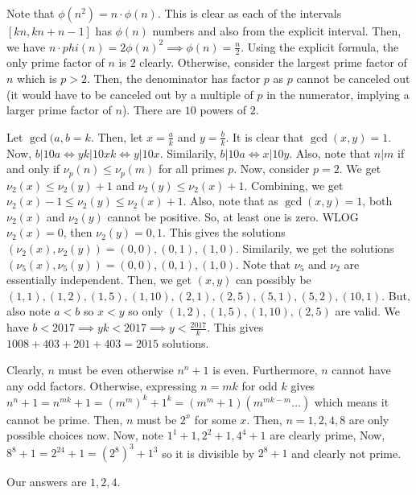 \documentclass[11pt]{article}
\begin{document}
\begin{sol}
Note that $\phi(n^2)=n\cdot \phi(n)$. This is clear as each of the intervals $[kn,kn+n-1]$ has $\phi(n)$ numbers and also from the explicit interval. Then, we have $n\cdot phi(n)=2\phi(n)^2\implies \phi(n)=\frac{n}{2}$. Using the explicit formula, the only prime factor of $n$ is $2$ clearly. Otherwise, consider the largest prime factor of $n$ which is $p>2$. Then, the denominator has factor $p$ as $p$ cannot be canceled out (it would have to be canceled out by a multiple of $p$ in the numerator, implying a larger prime factor of $n$). There are $\boxed{10}$ powers of $2$.
\end{sol}


\begin{sol}
Let $\gcd(a,b=k$. Then, let $x=\frac{a}{k}$ and $y=\frac{b}{k}$. It is clear that $\gcd(x,y)=1$. Now, $b|10a\iff yk|10xk\iff y|10x$. Similarily, $b|10a\iff x|10y$. Also, note that $n|m$ if and only if $\nu_{p}(n)\leq \nu_{p}(m)$ for all primes $p$. Now, consider $p=2$. We get $\nu_{2}(x)\leq \nu_{2}(y)+1$ and $\nu_{2}(y)\leq \nu_{2}(x)+1$. Combining, we get $\nu_{2}(x)-1\leq \nu_{2}(y)\leq \nu_{2}(x)+1$. Also, note that as $\gcd(x,y)=1$, both $\nu_{2}(x)$ and $\nu_{2}(y)$ cannot be positive. So, at least one is zero. WLOG $\nu_{2}(x)=0$, then $\nu_{2}(y)=0,1$. This gives the solutions $(\nu_{2}(x),\nu_{2}(y))=(0,0),(0,1),(1,0)$. Similarily, we get the solutions $(\nu_{5}(x),\nu_{5}(y))=(0,0),(0,1),(1,0)$. Note that $\nu_{5}$ and $\nu_{2}$ are essentially independent. Then, we get $(x,y)$ can possibly be $(1,1),(1,2),(1,5),(1,10),(2,1),(2,5),(5,1),(5,2),(10,1)$. But, also note $a<b$ so $x<y$ so only $(1,2),(1,5),(1,10),(2,5)$ are valid. We have $b<2017\implies yk<2017\implies y < \frac{2017}{k}$. This gives $1008+403+201+403=\boxed{2015}$ solutions.
\end{sol}

\begin{sol}
Clearly, $n$ must be even otherwise $n^{n}+1$ is even. Furthermore, $n$ cannot have any odd factors. Otherwise, expressing $n=mk$ for odd $k$ gives $n^{n}+1=n^{mk}+1=(m^{m})^{k}+1^{k}=(m^{m}+1)(m^{mk-m}\ldots)$ which means it cannot be prime. Then, $n$ must be $2^{x}$ for some $x$. Then, $n=1,2,4,8$ are only possible choices now. Now, note $1^{1}+1, 2^{2}+1, 4^{4}+1$ are clearly prime, Now, $8^{8}+1=2^{24}+1=(2^{8})^3+1^3$ so it is divisible by $2^{8}+1$ and clearly not prime.

Our answers are $\boxed{1,2,4}$.
\end{sol}
\end{document}
